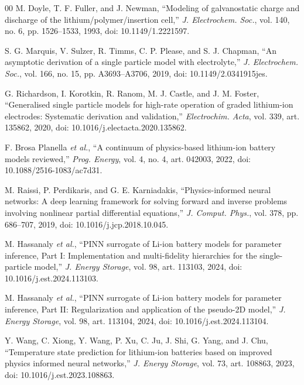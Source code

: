 \documentclass[conference]{IEEEtran}
\begin{document}
\begin{thebibliography}{00}
\setlength{\itemsep}{0pt}
M. Doyle, T. F. Fuller, and J. Newman, ``Modeling of galvanostatic charge and discharge of the lithium/polymer/insertion cell,'' \emph{J. Electrochem. Soc.}, vol. 140, no. 6, pp. 1526--1533, 1993, doi: 10.1149/1.2221597.

S. G. Marquis, V. Sulzer, R. Timms, C. P. Please, and S. J. Chapman, ``An asymptotic derivation of a single particle model with electrolyte,'' \emph{J. Electrochem. Soc.}, vol. 166, no. 15, pp. A3693--A3706, 2019, doi: 10.1149/2.0341915jes.

G. Richardson, I. Korotkin, R. Ranom, M. J. Castle, and J. M. Foster, ``Generalised single particle models for high-rate operation of graded lithium-ion electrodes: Systematic derivation and validation,'' \emph{Electrochim. Acta}, vol. 339, art. 135862, 2020, doi: 10.1016/j.electacta.2020.135862.

F. Brosa Planella \emph{et al.}, ``A continuum of physics-based lithium-ion battery models reviewed,'' \emph{Prog. Energy}, vol. 4, no. 4, art. 042003, 2022, doi: 10.1088/2516-1083/ac7d31.

M. Raissi, P. Perdikaris, and G. E. Karniadakis, ``Physics-informed neural networks: A deep learning framework for solving forward and inverse problems involving nonlinear partial differential equations,'' \emph{J. Comput. Phys.}, vol. 378, pp. 686--707, 2019, doi: 10.1016/j.jcp.2018.10.045.

M. Hassanaly \emph{et al.}, ``PINN surrogate of Li-ion battery models for parameter inference, Part I: Implementation and multi-fidelity hierarchies for the single-particle model,'' \emph{J. Energy Storage}, vol. 98, art. 113103, 2024, doi: 10.1016/j.est.2024.113103.

M. Hassanaly \emph{et al.}, ``PINN surrogate of Li-ion battery models for parameter inference, Part II: Regularization and application of the pseudo-2D model,'' \emph{J. Energy Storage}, vol. 98, art. 113104, 2024, doi: 10.1016/j.est.2024.113104.

Y. Wang, C. Xiong, Y. Wang, P. Xu, C. Ju, J. Shi, G. Yang, and J. Chu, ``Temperature state prediction for lithium-ion batteries based on improved physics informed neural networks,'' \emph{J. Energy Storage}, vol. 73, art. 108863, 2023, doi: 10.1016/j.est.2023.108863.


\end{thebibliography}
\end{document}
